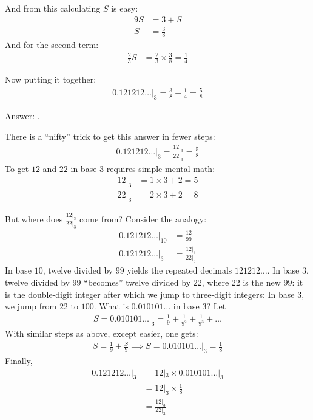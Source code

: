 \documentclass[12pt]{article}
\begin{document}
\begin{answer}
And from this calculating $S$ is easy:
\begin{align*}
9S  & = 3 + S \\
S & = \frac{3}{8}
\end{align*}
And for the second term:
\begin{align*}
\frac{2}{3} S & = \frac{2}{3} \times \frac{3}{8} = \frac{1}{4}
\end{align*}

Now putting it together:
\begin{align*}
0.121212\ldots|_{3} 
= \frac{3}{8} + \frac{1}{4} 
= \frac{5}{8}
\end{align*}

Answer: .
\bigskip

There is a ``nifty'' trick to get this answer in fewer steps:
\begin{align*}
0.121212\ldots|_{3} = \frac{12|_{3}}{22|_{3}} = \frac{5}{8}
\end{align*}
To get $12$ and $22$ in base $3$ requires simple mental math: 
\begin{align*}
12|_{3} & = 1 \times 3 + 2 = 5 \\
22|_{3} & = 2 \times 3 + 2 = 8
\end{align*}

But where does $\tfrac{12|_{3}}{22|_{3}}$ come from? Consider the analogy:
\begin{align*}
0.121212\ldots|_{10} & = \frac{12}{99} \\
0.121212\ldots|_{3}~ & = \frac{12|_{3}}{22|_{3}} 
\end{align*}
In base $10$, twelve divided by $99$ yields the repeated decimals $121212\ldots$. In base $3$, twelve divided by $99$ ``becomes'' twelve divided by $22$, where $22$ is the new $99$: it is the double-digit integer after which we jump to three-digit integers: In base $3$, we jump from $22$ to $100$. What is $0.010101\ldots$ in base $3$? Let
\begin{align*}
S = 0.010101\ldots|_{3} 
  = \frac{1}{9} + \frac{1}{9^2} + \frac{1}{9^3} +\ldots
\end{align*}
With similar steps as above, except easier, one gets:
\begin{align*}
S = \frac{1}{9} + \frac{S}{9} \implies 
S = 0.010101\ldots|_{3} = \frac{1}{8} 
\end{align*}
Finally,
\begin{align*}
0.121212\ldots|_{3} 
& = 12|_{3} \times 0.010101\ldots|_{3}\\
& = 12|_{3} \times \frac{1}{8} \\
& = \frac{12|_{3}}{22|_{3}}
\end{align*}
\end{answer}
\end{document}
